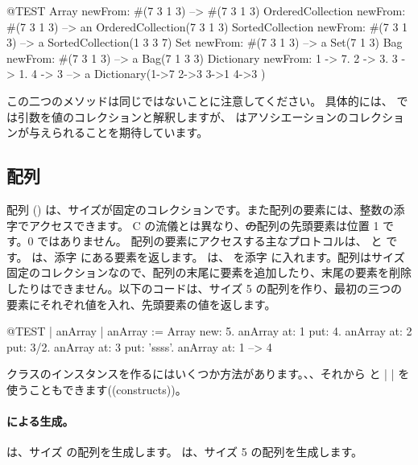 \documentclass[a4paper,10pt,twoside]{book}
\begin{document}
\begin{code}{@TEST}
Array newFrom: #(7 3 1 3)                                          --> #(7 3 1 3)
OrderedCollection newFrom: #(7 3 1 3)                     --> an OrderedCollection(7 3 1 3)
SortedCollection newFrom: #(7 3 1 3)                       --> a SortedCollection(1 3 3 7)
Set newFrom: #(7 3 1 3)                                            --> a Set(7 1 3)
Bag newFrom: #(7 3 1 3)                                           --> a Bag(7 1 3 3)
Dictionary newFrom: {1 -> 7. 2 -> 3. 3 -> 1. 4 -> 3} --> a Dictionary(1->7 2->3 3->1 4->3 )
\end{code}
\noindent
この二つのメソッドは同じではないことに注意してください。
具体的には、 では引数を値のコレクションと解釈しますが、 はアソシエーションのコレクションが与えられることを期待しています。

\subsection{配列}
配列 () は、サイズが固定のコレクションです。また配列の要素には、整数の添字でアクセスできます。
C の流儀とは異なり、\st の配列の先頭要素は位置 1 です。0 ではありません。
配列の要素にアクセスする主なプロトコルは、 と  です。 は、添字  にある要素を返します。 は、 を添字  に入れます。配列はサイズ固定のコレクションなので、配列の末尾に要素を追加したり、末尾の要素を削除したりはできません。以下のコードは、サイズ 5 の配列を作り、最初の三つの要素にそれぞれ値を入れ、先頭要素の値を返します。

\begin{code}{@TEST | anArray | }
anArray := Array new: 5.
anArray at: 1 put: 4.
anArray at: 2 put: 3/2.
anArray at: 3 put: 'ssss'.
anArray at: 1 --> 4
\end{code}

 クラスのインスタンスを作るにはいくつか方法があります。、、それから \ct{#( )} と \ct|{ }| を使うこともできます((constructs))。

\paragraph{ による生成。}  は、サイズ  の配列を生成します。
 は、サイズ 5 の配列を生成します。
\end{document}
